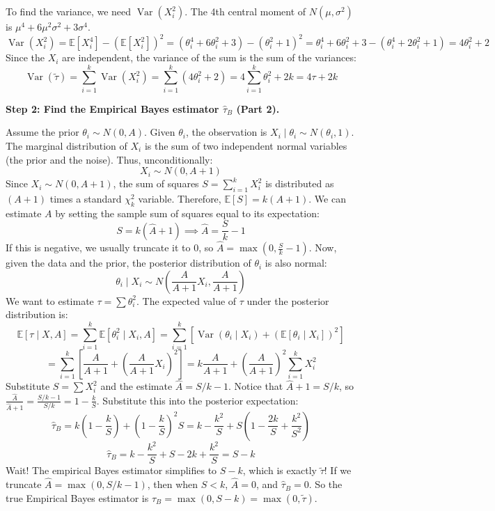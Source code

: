 \begin{solution}
To find the variance, we need $\operatorname{Var}(X_i^2)$. The 4th central moment of $N(\mu, \sigma^2)$ is $\mu^4 + 6\mu^2\sigma^2 + 3\sigma^4$.
\[ \operatorname{Var}(X_i^2) = \mathbb{E}[X_i^4] - (\mathbb{E}[X_i^2])^2 = (\theta_i^4 + 6\theta_i^2 + 3) - (\theta_i^2 + 1)^2 = \theta_i^4 + 6\theta_i^2 + 3 - (\theta_i^4 + 2\theta_i^2 + 1) = 4\theta_i^2 + 2 \]
Since the $X_i$ are independent, the variance of the sum is the sum of the variances:
\[ \operatorname{Var}(\tilde{\tau}) = \sum_{i=1}^k \operatorname{Var}(X_i^2) = \sum_{i=1}^k (4\theta_i^2 + 2) = 4\sum_{i=1}^k \theta_i^2 + 2k = 4\tau + 2k \]

\textbf{Step 2: Find the Empirical Bayes estimator $\hat{\tau}_B$ (Part 2).}

Assume the prior $\theta_i \sim N(0, A)$.
Given $\theta_i$, the observation is $X_i \mid \theta_i \sim N(\theta_i, 1)$.
The marginal distribution of $X_i$ is the sum of two independent normal variables (the prior and the noise). Thus, unconditionally:
\[ X_i \sim N(0, A + 1) \]
Since $X_i \sim N(0, A+1)$, the sum of squares $S = \sum_{i=1}^k X_i^2$ is distributed as $(A+1)$ times a standard $\chi^2_k$ variable.
Therefore, $\mathbb{E}[S] = k(A+1)$.
We can estimate $A$ by setting the sample sum of squares equal to its expectation:
\[ S = k(\hat{A} + 1) \implies \hat{A} = \frac{S}{k} - 1 \]
If this is negative, we usually truncate it to 0, so $\hat{A} = \max(0, \frac{S}{k} - 1)$.
Now, given the data and the prior, the posterior distribution of $\theta_i$ is also normal:
\[ \theta_i \mid X_i \sim N\left( \frac{A}{A+1} X_i, \frac{A}{A+1} \right) \]
We want to estimate $\tau = \sum \theta_i^2$. The expected value of $\tau$ under the posterior distribution is:
\[ \mathbb{E}[\tau \mid X, A] = \sum_{i=1}^k \mathbb{E}[\theta_i^2 \mid X_i, A] = \sum_{i=1}^k \left[ \operatorname{Var}(\theta_i \mid X_i) + (\mathbb{E}[\theta_i \mid X_i])^2 \right] \]
\[ = \sum_{i=1}^k \left[ \frac{A}{A+1} + \left( \frac{A}{A+1} X_i \right)^2 \right] = k \frac{A}{A+1} + \left( \frac{A}{A+1} \right)^2 \sum_{i=1}^k X_i^2 \]
Substitute $S = \sum X_i^2$ and the estimate $\hat{A} = S/k - 1$.
Notice that $\hat{A} + 1 = S/k$, so $\frac{\hat{A}}{\hat{A}+1} = \frac{S/k - 1}{S/k} = 1 - \frac{k}{S}$.
Substitute this into the posterior expectation:
\[ \hat{\tau}_B = k \left( 1 - \frac{k}{S} \right) + \left( 1 - \frac{k}{S} \right)^2 S = k - \frac{k^2}{S} + S \left( 1 - \frac{2k}{S} + \frac{k^2}{S^2} \right) \]
\[ \hat{\tau}_B = k - \frac{k^2}{S} + S - 2k + \frac{k^2}{S} = S - k \]
Wait! The empirical Bayes estimator simplifies to $S - k$, which is exactly $\tilde{\tau}$!
If we truncate $\hat{A} = \max(0, S/k - 1)$, then when $S < k$, $\hat{A} = 0$, and $\hat{\tau}_B = 0$.
So the true Empirical Bayes estimator is $\hat{\tau}_B = \max(0, S - k) = \max(0, \tilde{\tau})$.


\end{solution}
